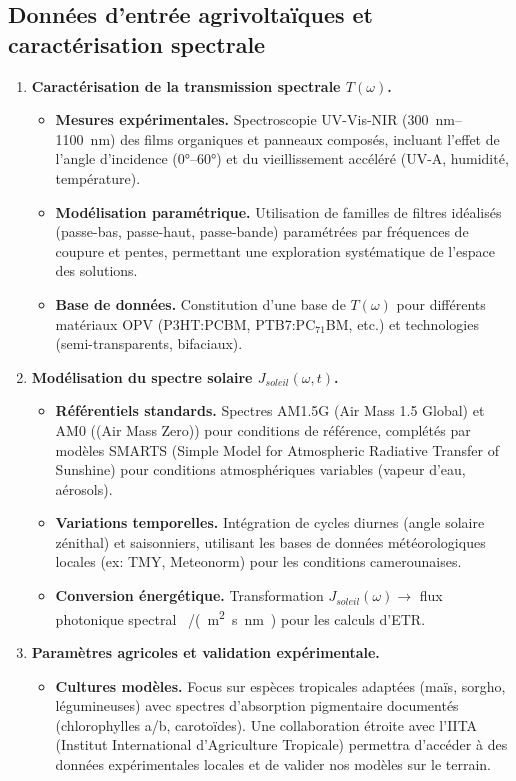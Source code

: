 \documentclass[12pt, a4paper]{article}
\begin{document}
\subsection{Données d'entrée agrivoltaïques et caractérisation spectrale}

\begin{enumerate}
    \item \textbf{Caractérisation de la transmission spectrale $T(\omega)$.}
    \begin{itemize}
        \item \textbf{Mesures expérimentales.} Spectroscopie UV-Vis-NIR (\SIrange{300}{1100}{\nano\meter}) des films organiques et panneaux composés, incluant l'effet de l'angle d'incidence (\ang{0}--\ang{60}) et du vieillissement accéléré (UV-A, humidité, température).
        \item \textbf{Modélisation paramétrique.} Utilisation de familles de filtres idéalisés (passe-bas, passe-haut, passe-bande) paramétrées par fréquences de coupure et pentes, permettant une exploration systématique de l'espace des solutions.
        \item \textbf{Base de données.} Constitution d'une base de $T(\omega)$ pour différents matériaux OPV (P3HT:PCBM, PTB7:PC$_{71}$BM, etc.) et technologies (semi-transparents, bifaciaux).
\end{itemize}
    
    \item \textbf{Modélisation du spectre solaire $J_{soleil}(\omega,t)$.}
    \begin{itemize}
        \item \textbf{Référentiels standards.} Spectres AM1.5G (Air Mass 1.5 Global) et AM0 ((Air Mass Zero)) pour conditions de référence, complétés par modèles SMARTS (Simple Model for Atmospheric Radiative Transfer of Sunshine) pour conditions atmosphériques variables (vapeur d'eau, aérosols).
        \item \textbf{Variations temporelles.} Intégration de cycles diurnes (angle solaire zénithal) et saisonniers, utilisant les bases de données météorologiques locales (ex: TMY, Meteonorm) pour les conditions camerounaises.
        \item \textbf{Conversion énergétique.} Transformation $J_{soleil}(\omega) \rightarrow$ flux photonique spectral \SI{}{/(\meter\squared\second\nano\meter)} pour les calculs d'ETR.
\end{itemize}
    
    \item \textbf{Paramètres agricoles et validation expérimentale.}
    \begin{itemize}
        \item \textbf{Cultures modèles.} Focus sur espèces tropicales adaptées (maïs, sorgho, légumineuses) avec spectres d'absorption pigmentaire documentés (chlorophylles a/b, carotoïdes). Une collaboration étroite avec l'IITA (Institut International d'Agriculture Tropicale) permettra d'accéder à des données expérimentales locales et de valider nos modèles sur le terrain.
        

\end{itemize}
\end{enumerate}
\end{document}

